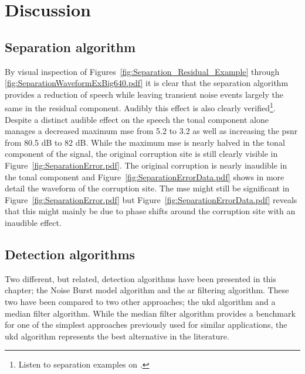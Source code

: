 \section{Discussion}\label{sec:WPdiscussion}
\subsection{Separation algorithm}

By visual inspection of Figures~\ref{fig:Separation_Residual_Example} through \ref{fig:SeparationWaveformExBig640.pdf} it is clear that the separation algorithm provides a reduction of speech while leaving transient noise events largely the same in the residual component. Audibly this effect is also clearly verified\footnote{Listen to separation examples on \siteURL.}. Despite a distinct audible effect on the speech the tonal component alone manages a decreased maximum \gls{mse} from 5.2 to 3.2 as well as increasing the \gls{psnr} from 80.5 dB to 82 dB. While the maximum \gls{mse} is nearly halved in the tonal component of the signal, the original corruption site is still clearly visible in Figure~\ref{fig:SeparationError.pdf}. The original corruption is nearly inaudible in the tonal component and Figure~\ref{fig:SeparationErrorData.pdf} shows in more detail the waveform of the corruption site. The \gls{mse} might still be significant in Figure~\ref{fig:SeparationError.pdf} but Figure~\ref{fig:SeparationErrorData.pdf} reveals that this might mainly be due to phase shifts around the corruption site with an inaudible effect.

\subsection{Detection algorithms}
Two different, but related, detection algorithms have been presented in this chapter; the Noise Burst model algorithm and the \gls{ar} filtering algorithm. These two have been compared to two other approaches; the \gls{ukd} algorithm \cite{Subramanya2007} and a median filter algorithm. While the median filter algorithm provides a benchmark for one of the simplest approaches previously used for similar applications, the \gls{ukd} algorithm represents the best alternative in the literature.

